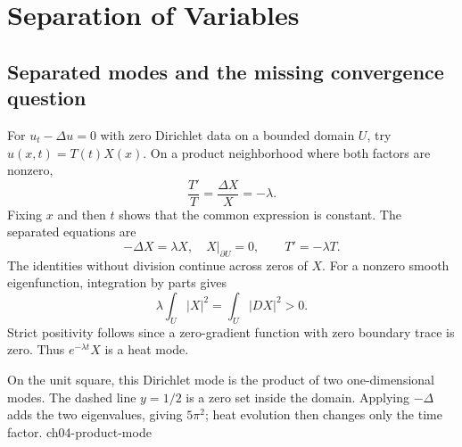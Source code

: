 \Needspace{65mm}
\section{Separation of Variables}\label{sec:4-1}
\Needspace{35mm}
\subsection{Separated modes and the missing convergence question}
For $u_t-\Delta u=0$ with zero Dirichlet data on a bounded domain $U$,
try $u(x,t)=T(t)X(x)$. On a product neighborhood where both factors
are nonzero,
\[
 \frac{T'}T=\frac{\Delta X}X=-\lambda .
\]
Fixing $x$ and then $t$ shows that the common expression is constant.
The separated equations are
\[
 -\Delta X=\lambda X,\quad X|_{\partial U}=0,\qquad
 T'=-\lambda T .
\]
The identities without division continue across zeros of $X$.
For a nonzero smooth eigenfunction, integration by parts gives
\[
 \lambda\int_U|X|^2=\int_U|DX|^2>0 .
\]
Strict positivity follows since a zero-gradient function with zero
boundary trace is zero. Thus $e^{-\lambda t}X$ is a heat mode.

\Needspace{45mm}

{On the unit square, this Dirichlet mode is the product of two one-dimensional modes. The dashed line $y=1/2$ is a zero set inside the domain. Applying $-\Delta$ adds the two eigenvalues, giving $5\pi^2$; heat evolution then changes only the time factor.}
{ch04-product-mode}

